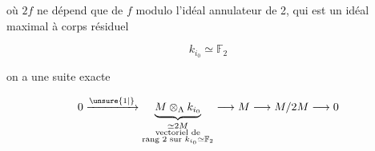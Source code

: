 où $2f$ ne dépend que de $f$ modulo l'idéal  annulateur de 2, qui est un idéal maximal à corps résiduel 

\[
k_{i_0}\simeq\mathbb F_2
\]

on a  une suite exacte

\[
0\xrightarrow{\unsure{1|{}}}\underset{\substack{\simeq 2M\\\text{vectoriel de}\\\text{rang 2 sur }k_{i_0}\simeq\mathbb F_2}}{\underbrace{M\otimes_\Lambda k_{i_0}}}\longrightarrow M\longrightarrow M/2M\longrightarrow0
\]
